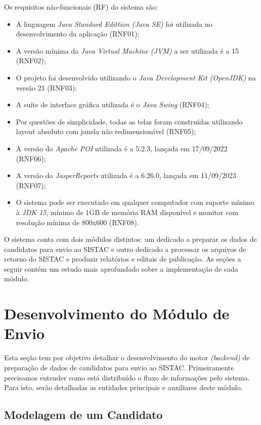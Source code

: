 \documentclass[
	12pt,			%
	openright,		%
	oneside,	
	a4paper,		%
	english,		%
	brazil			%
]{abntex2/abntex2}  %
\begin{document}
		Os requisitos não-funcionais (RF) do sistema são:
	
		\begin{itemize}
			
			\item A linguagem \textit{Java Standard Edittion (Java SE)} foi utilizada no desenvolvimento da aplicação (RNF01);
			\item A versão mínima da \textit{Java Virtual Machine (JVM)} a ser utilizada é a 15 (RNF02);
			\item O projeto foi desenvolvido utilizando o \textit{Java Development Kit (OpenJDK)} na versão 21 (RNF03);
			\item A suíte de interface gráfica utilizada é o \textit{Java Swing} (RNF04);
			\item Por questões de simplicidade, todas as telas foram construídas utilizando layout absoluto com janela não redimensionável (RNF05);
			\item A versão do \textit{Apache POI} utilizada é a 5.2.3, lançada em 17/09/2022 (RNF06);
			\item A versão do \textit{JasperReports\textregistered} utilizada é a 6.26.0, lançada em 11/09/2023 (RNF07);
			\item O sistema pode ser executado em qualquer computador com suporte mínimo à \textit{JDK 15}, mínimo de 1GB de memória RAM disponível e monitor com resolução mínima de 800x600 (RNF08).
			
		\end{itemize}
	
		O sistema conta com dois módulos distintos: um dedicado a preparar os dados de candidatos para envio ao SISTAC e outro dedicado a processar os arquivos de retorno do SISTAC e produzir relatórios e editais de publicação. As seções a seguir contém um estudo mais aprofundado sobre a implementação de cada módulo.

		\section{Desenvolvimento do Módulo de Envio}
	
			Esta seção tem por objetivo detalhar o desenvolvimento do motor \textit{(backend)} de preparação de dados de candidatos para envio ao SISTAC. Primeiramente precisamos entender como está distribuído o fluxo de informações pelo sistema. Para isto, serão detalhadas as entidades principais e auxiliares deste módulo.
	
			\subsection{Modelagem de um Candidato} \label{candidato}
	
\end{document}
